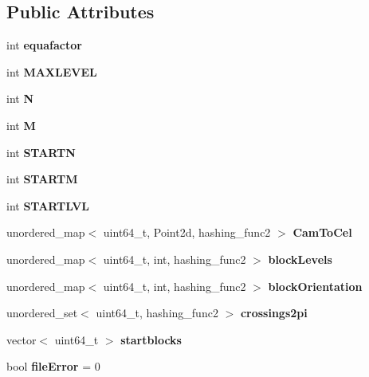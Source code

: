 \subsection*{Public Attributes}
\begin{DoxyCompactItemize}
\item 
\mbox{\label{class_grid_a55c6d01c5ce157503ad65c76175984a6}} 
int {\bfseries equafactor}
\item 
\mbox{\label{class_grid_acecb158a0514ef487ef26ba72709142c}} 
int {\bfseries M\+A\+X\+L\+E\+V\+EL}
\item 
\mbox{\label{class_grid_a8ab29c0962ba6fdc8e3f95d055d91350}} 
int {\bfseries N}
\item 
\mbox{\label{class_grid_af7251909c749e07d3b2b1cc39719f8a7}} 
int {\bfseries M}
\item 
\mbox{\label{class_grid_abd312dce45faff8533e0f5d27abb4d25}} 
int {\bfseries S\+T\+A\+R\+TN}
\item 
\mbox{\label{class_grid_a910ff46d2eec5ee3501f0f55de200eb3}} 
int {\bfseries S\+T\+A\+R\+TM}
\item 
\mbox{\label{class_grid_aed6a565b45df14df05578e469404998b}} 
int {\bfseries S\+T\+A\+R\+T\+L\+VL}
\item 
\mbox{\label{class_grid_a4894face288aec18cbdcbd0d2cf73116}} 
unordered\+\_\+map$<$ uint64\+\_\+t, Point2d, hashing\+\_\+func2 $>$ {\bfseries Cam\+To\+Cel}
\item 
\mbox{\label{class_grid_a7568163db06ee89b52ee7a8832ced2fc}} 
unordered\+\_\+map$<$ uint64\+\_\+t, int, hashing\+\_\+func2 $>$ {\bfseries block\+Levels}
\item 
\mbox{\label{class_grid_a3ed8574f9a9a9e1f6681f28384787119}} 
unordered\+\_\+map$<$ uint64\+\_\+t, int, hashing\+\_\+func2 $>$ {\bfseries block\+Orientation}
\item 
\mbox{\label{class_grid_a3ae48602ce6411691bf77845e8651558}} 
unordered\+\_\+set$<$ uint64\+\_\+t, hashing\+\_\+func2 $>$ {\bfseries crossings2pi}
\item 
\mbox{\label{class_grid_a09803882dad4f9f644e08a0a0138f7be}} 
vector$<$ uint64\+\_\+t $>$ {\bfseries startblocks}
\item 
\mbox{\label{class_grid_a2e65634a09b73e71da280fd8a9f6715f}} 
bool {\bfseries file\+Error} = 0
\end{DoxyCompactItemize}

